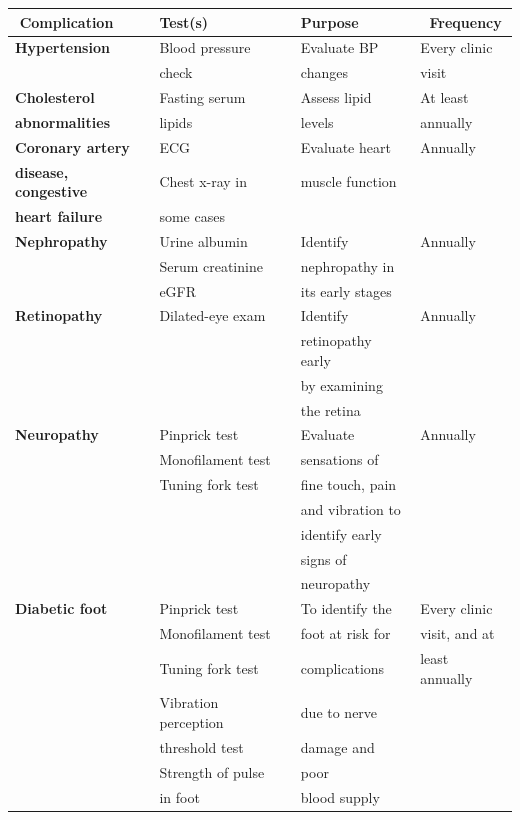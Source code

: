 {
\small\addtolength{\tabcolsep}{-5pt}
\begin{longtable}{|l|l|l|l|}
\hline
\quad\,\,\textbf{Complication} & \qquad\quad\textbf{Test(s)} & \qquad\textbf{Purpose} & \,\,\,\,\textbf{Frequency}\\
\hline
\textbf{Hypertension} & Blood pressure & Evaluate BP & Every clinic\\
 & check & changes & visit\\
\hline
\textbf{Cholesterol} & Fasting serum & Assess lipid & At least\\
\textbf{abnormalities} & lipids & levels & annually\\
\hline
\textbf{Coronary artery} & ECG & Evaluate heart & Annually\\
\textbf{disease, congestive} & Chest x-ray in & muscle function & \\
\textbf{heart failure} & some cases &  & \\
\hline
\textbf{Nephropathy} & Urine albumin & Identify & Annually\\
 & Serum creatinine & nephropathy in & \\
 & eGFR & its early stages & \\
\hline
\textbf{Retinopathy} & Dilated-eye exam & Identify & Annually\\
 &  & retinopathy early & \\
 &  & by examining & \\
 &  & the retina & \\
\hline
\textbf{Neuropathy} & Pinprick test & Evaluate & Annually\\
 & Monofilament test & sensations of & \\
 & Tuning fork test & fine touch, pain & \\
 &  & and vibration to & \\
 &  & identify early & \\
 &  & signs of & \\
 &  & neuropathy & \\
\hline
\textbf{Diabetic foot} & Pinprick test & To identify the & Every clinic\\
 & Monofilament test & foot at risk for & visit, and at\\
 & Tuning fork test & complications & least annually\\
 & Vibration perception & due to nerve & \\
 & threshold test & damage and & \\
 & Strength of pulse & poor & \\
 & in foot & blood supply & \\
\hline
\end{longtable}
}\relax


